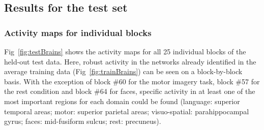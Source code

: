 \documentclass[fleqn,10pt]{SelfArx} %
\begin{document}
\subsection{Results for the test set}

\subsubsection*{Activity maps for individual blocks}

Fig~\ref{fig:testBrains} shows the activity maps for all 25 individual blocks of the held-out test data. Here, robust activity in the networks already identified in the average training data (Fig~\ref{fig:trainBrains}) can be seen on a block-by-block basis. With the exception of block \#60 for the motor imagery task, block \#57 for the rest condition and block \#64 for faces, specific activity in at least one of the most important regions for each domain could be found (language: superior temporal areas; motor: superior parietal areas; visuo-spatial: parahippocampal gyrus; faces: mid-fusiform sulcus; rest: precuneus).
\end{document}
